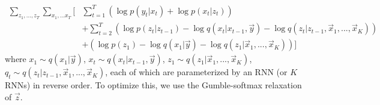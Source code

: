 \documentclass[12pt]{article}
\begin{document}
\begin{align}
    \sum_{z_1,...,z_T} \sum_{x_1,...x_T}[& \sum_{t=1}^T(\log p(y_t|x_t) + \log p(x_t|z_t)) \\
    & + \sum_{t=2}^T (\log p(z_t|z_{t-1}) - \log q(x_t|x_{t-1},\vec{y}) - \log q(z_t|z_{t-1},\vec{x}_1, ..., \vec{x}_K)) \\
    & + (\log p(z_1) - \log q(x_1|\vec{y}) - \log q(z_1|\vec{x}_1, ..., \vec{x}_K))]
\end{align}
where $x_1 \sim q(x_1|\vec{y})$, $x_t \sim q(x_t|x_{t-1},\vec{y})$, $z_1 \sim q(z_1|\vec{x}_1, ..., \vec{x}_K)$, $q_t \sim q(z_t|z_{t-1},\vec{x}_1, ..., \vec{x}_K)$, each of which are parameterized by an RNN (or $K$ RNNs) in reverse order. To optimize this, we use the Gumble-softmax relaxation of $\vec{z}$.
\end{document}
